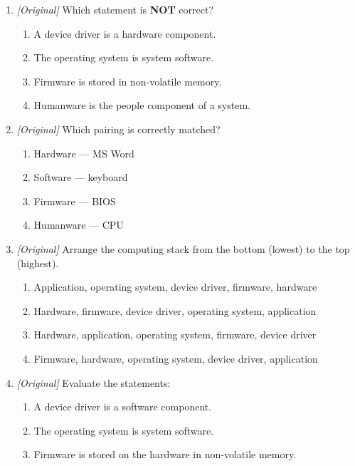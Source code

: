\documentclass[11pt]{article}
\begin{document}
\begin{enumerate}[label=\textbf{Q\arabic*.}, leftmargin=*]
\begin{enumerate}[label=\Alph*.]
    \item the people who use and operate the computer system
    \item the startup code in ROM
  \end{enumerate}
\item \textit{[Original]} Which statement is \textbf{NOT} correct?
  \begin{enumerate}[label=\Alph*.]
    \item A device driver is a hardware component.
    \item The operating system is system software.
    \item Firmware is stored in non-volatile memory.
    \item Humanware is the people component of a system.
  \end{enumerate}
\item \textit{[Original]} Which pairing is correctly matched?
  \begin{enumerate}[label=\Alph*.]
    \item Hardware --- MS Word
    \item Software --- keyboard
    \item Firmware --- BIOS
    \item Humanware --- CPU
  \end{enumerate}
\item \textit{[Original]} Arrange the computing stack from the bottom
  (lowest) to the top (highest).
  \begin{enumerate}[label=\Alph*.]
    \item Application, operating system, device driver, firmware, hardware
    \item Hardware, firmware, device driver, operating system, application
    \item Hardware, application, operating system, firmware, device driver
    \item Firmware, hardware, operating system, device driver, application
  \end{enumerate}
\item \textit{[Original]} Evaluate the statements:
  \begin{enumerate}[label=\Roman*.]
    \item A device driver is a software component.
    \item The operating system is system software.
    \item Firmware is stored on the hardware in non-volatile memory.
  \end{enumerate}

\end{enumerate}
\end{document}

